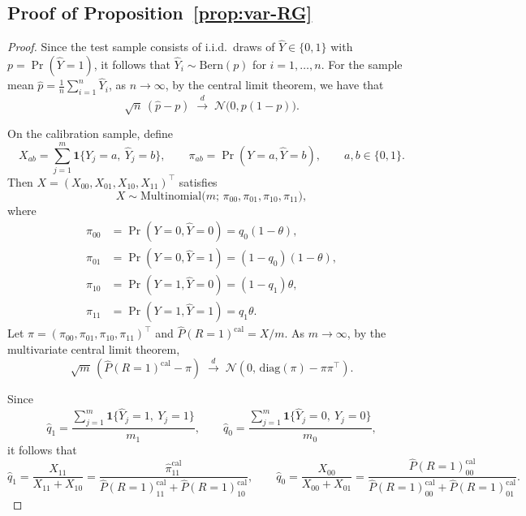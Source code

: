 \subsection{Proof of Proposition~\ref{prop:var-RG}}
\begin{proof}
Since the test sample consists of i.i.d.\ draws of $\hat Y\in\{0,1\}$ with $
p = \Pr(\hat Y=1)$,
it follows that $\hat Y_i \sim \mathrm{Bern}(p)$ for $i=1,\dots,n$. For the sample mean $\hat{p}=\frac1n\sum_{i=1}^n \hat Y_i$, as $n\to\infty$,
by the central limit theorem, we have that
\[
\sqrt{n}\,(\hat{p}-p)\;\xrightarrow{d}\;\mathcal{N}\!\bigl(0,p(1-p)\bigr).
\]

\noindent
On the calibration sample, define
\[
X_{ab}= \sum_{j=1}^m\mathbf{1}\{Y_j=a,\ \hat Y_j=b\},
\qquad \pi_{ab}=\Pr(Y=a,\hat Y=b),
\qquad a,b\in \{0,1\}.
\]
Then $X=(X_{00},X_{01},X_{10},X_{11})^\top$ satisfies
\[
X\sim\mathrm{Multinomial}\bigl(m;\,\pi_{00},\pi_{01},\pi_{10},\pi_{11}\bigr),
\]
where
\begin{align*}
    \pi_{00}&=\Pr(Y=0,\hat Y=0)=q_0(1-\theta),\\
    \pi_{01}&=\Pr(Y=0,\hat Y=1)=(1-q_0)(1-\theta),\\
    \pi_{10}&=\Pr(Y=1,\hat Y=0)=(1-q_1)\theta,\\
    \pi_{11}&=\Pr(Y=1,\hat Y=1)=q_1\theta.
\end{align*}
Let $\pi=(\pi_{00},\pi_{01},\pi_{10},\pi_{11})^\top$ and $\hat{P}(R=1)^{\mathrm{cal}}=X/m$. As $m\to\infty$,
by the multivariate central limit theorem,
\[
\sqrt{m}\,(\hat{P}(R=1)^{\mathrm{cal}}-\pi)
\;\xrightarrow{d}\;
\mathcal{N}\!\left(0,\,\mathrm{diag}(\pi)-\pi\pi^\top\right).
\]

\noindent
Since
\[
\hat q_1=\frac{\sum_{j=1}^m\mathbf{1}\{\hat Y_j=1,\ Y_j=1\}}{m_1},
\qquad 
\hat q_0=\frac{\sum_{j=1}^m\mathbf{1}\{\hat Y_j=0,\ Y_j=0\}}{m_0},
\]
it follows that
\[
\hat q_1=\frac{X_{11}}{X_{11}+X_{10}}=\frac{\hat \pi^{\mathrm{cal}}_{11}}{\hat{P}(R=1)^{\mathrm{cal}}_{11}+\hat{P}(R=1)^{\mathrm{cal}}_{10}},
\qquad 
\hat q_0=\frac{X_{00}}{X_{00}+X_{01}}=\frac{\hat{P}(R=1)^{\mathrm{cal}}_{00}}{\hat{P}(R=1)^{\mathrm{cal}}_{00}+\hat{P}(R=1)^{\mathrm{cal}}_{01}}.
\]


\end{proof}
